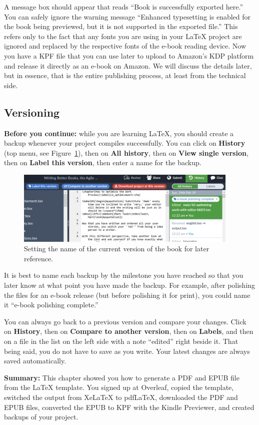 A message box should appear that reads ``Book is successfully exported here.'' You can safely ignore the warning message ``Enhanced typesetting is enabled for the book being previewed, but it is not supported in the exported file.'' This refers only to the fact that any fonts you are using in your LaTeX project are ignored and replaced by the respective fonts of the e-book reading device. Now you have a KPF file that you can use later to upload to Amazon's KDP platform and release it directly as an e-book on Amazon. We will discuss the details later, but in essence, that is the entire publishing process, at least from the technical side.



\subsection{Versioning}\label{versioning:sec} 

\textbf{Before you continue:} while you are learning LaTeX, you should create a backup whenever your project compiles successfully. You can click on \textbf{History} (top menu, see Figure~\ref{versions:fig}), then on \textbf{All history}, then on \textbf{View single version}, then on \textbf{Label this version}, then enter a name for the backup.

\begin{figure}[H]\centering
\includegraphics[width=0.95\textwidth]{images/versions.png}
\caption{Setting the name of the current version of the book for later reference.}
\label{versions:fig}
\end{figure}

It is best to name each backup by the milestone you have reached so that you later know at what point you have made the backup. For example, after polishing the files for an e-book release (but before polishing it for print), you could name it ``e-book polishing complete.''

You can always go back to a previous version and compare your changes. Click on \textbf{History}, then on \textbf{Compare to another version}, then on \textbf{Labels}, and then on a file in the list on the left side with a note ``edited'' right beside it. That being said, you do not have to save as you write. Your latest changes are always saved automatically. 

\textbf{Summary:} This chapter showed you how to generate a PDF and EPUB file from the LaTeX template. You signed up at Overleaf, copied the template, switched the output from XeLaTeX to pdfLaTeX, downloaded the PDF and EPUB files, converted the EPUB to KPF with the Kindle Previewer, and created backups of your project.